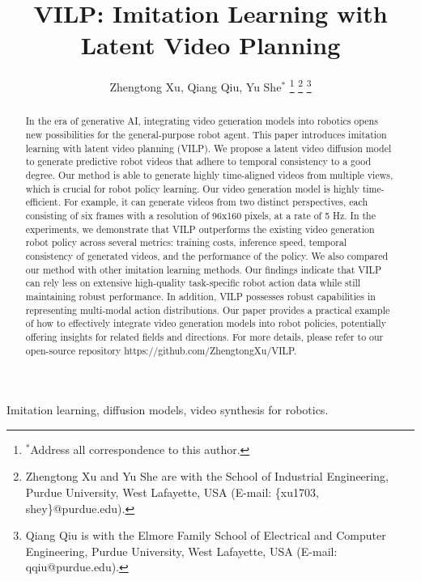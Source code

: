 \documentclass[doublecolumn]{IEEEtran}
\begin{document}
\title{VILP: Imitation Learning with Latent Video Planning}
\author{
Zhengtong Xu, Qiang Qiu, Yu She$^{*}$
\thanks{$^{*}$Address all correspondence to this author.}
\thanks{Zhengtong Xu and Yu She are with the School of Industrial Engineering, Purdue University, West Lafayette, USA  (E-mail: \{xu1703, shey\}@purdue.edu).}
\thanks{Qiang Qiu is with the Elmore Family School of Electrical and Computer Engineering, Purdue University, West Lafayette, USA  (E-mail: qqiu@purdue.edu).}
}


\maketitle

\begin{abstract}
In the era of generative AI, integrating video generation models into robotics opens new possibilities for the general-purpose robot agent. This paper introduces imitation learning with latent video planning (VILP). We propose a latent video diffusion model to generate predictive robot videos that adhere to temporal consistency to a good degree. Our method is able to generate highly time-aligned videos from multiple views, which is crucial for robot policy learning.  Our video generation model is highly time-efficient. For example, it can generate videos from two distinct perspectives, each consisting of six frames with a resolution of 96x160 pixels, at a rate of 5 Hz. In the experiments, we demonstrate that VILP outperforms the existing video generation robot policy across several metrics: training costs, inference speed, temporal consistency of generated videos, and the performance of the policy. We also compared our method with other imitation learning methods. Our findings indicate that VILP can rely less on extensive high-quality task-specific robot action data while still maintaining robust performance. {In addition, VILP possesses robust capabilities in representing multi-modal action distributions.}  Our paper provides a practical example of how to effectively integrate video generation models into robot policies, potentially offering insights for related fields and directions. {For more details, please refer to our open-source repository https://github.com/ZhengtongXu/VILP.}
\end{abstract}
\begin{IEEEkeywords}
Imitation learning, diffusion models, video synthesis for robotics.
\end{IEEEkeywords}


\end{document}
